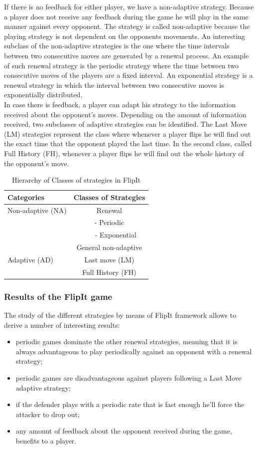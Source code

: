 If there is no feedback for either player, we have a non-adaptive strategy. Because a player does not receive any feedback during the game he will play in the same manner against every opponent. The strategy is called non-adaptive because the playing strategy is not dependent on the opponents movements. An interesting subclass of the non-adaptive strategies is the one where the time intervals between two consecutive moves are generated by a renewal process. An example of such renewal strategy is the periodic strategy where the time between two consecutive moves of the players are a fixed interval. An exponential strategy is a renewal strategy in which the interval between two consecutive moves is exponentially distributed. \\

In case there is feedback, a player can adapt his strategy to the information received about the opponent's moves. Depending on the amount of information received, two subclasses of adaptive strategies can be identified. The Last Move (LM) strategies represent the class where whenever a player flips he will find out the exact time that the opponent played the last time. In the second class, called Full History (FH), whenever a player flips he will find out the whole history of the opponent's move. \\


 \begin{table}
 \centering
 \begin{tabular}{ l | c  }
  \textbf{Categories} & \textbf{Classes of Strategies} \\
  \hline Non-adaptive (NA) & Renewal \\
  & - Periodic \\
  & ~~~ - Exponential \\
  & General non-adaptive \\
  \hline Adaptive (AD) & Last move (LM) \\
  & Full History (FH) \\  
\end{tabular}
 \caption{Hierarchy of Classes of strategies in FlipIt}
 \label{table:Strategies}
 \end{table}

\subsubsection{Results of the FlipIt game}
The study of the different strategies by means of FlipIt framework allows to derive a number of interesting results:  
\begin{itemize}
\item periodic games dominate the other renewal strategies, meaning that it is always advantageous to play periodically against an opponent with a renewal strategy;
\item periodic games are disadvantageous against players following a Last Move adaptive strategy;
\item if the defender plays with a periodic rate that is fast enough he'll force the attacker to drop out;
\item any amount of feedback about the opponent received during the game, benefits to a player.
\end{itemize}
 
